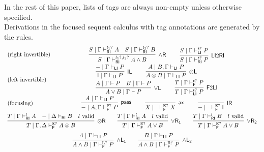 \documentclass[submission,copyright,creativecommons]{eptcs}
\theoremstyle{definition}
\newcommand{\tl}{\otimes \mathsf{L}}
\newcommand{\tr}{\otimes \mathsf{R}}
\newcommand{\pass}{\mathsf{pass}}
\newcommand{\unitl}{\mathsf{IL}}
\newcommand{\unitr}{\mathsf{IR}}
\newcommand{\andlone}{\land \mathsf{L_{1}}}
\newcommand{\andltwo}{\land \mathsf{L_{2}}}
\newcommand{\andr}{\land \mathsf{R}}
\newcommand{\orl}{\lor \mathsf{L}}
\newcommand{\orrone}{\lor \mathsf{R_{1}}}
\newcommand{\orrtwo}{\lor \mathsf{R_{2}}}
\newcommand{\ax}{\mathsf{ax}}
\newcommand{\ot}{\otimes}
\newcommand{\I}{\mathsf{I}}
\newcommand{\RI}{\mathsf{RI}}
\newcommand{\LI}{\mathsf{LI}}
\newcommand{\F}{\mathsf{F}}
\newcommand{\tP}{\mathbb{P}}
\newcommand{\tL}{\mathbb{L}}
\newcommand{\tR}{\mathbb{R}}
\newcommand{\tE}{\mathbb{E}}
\newcommand{\proofbox}[1]{\begin{tabular}{l} #1 \end{tabular}}
\begin{document}
In the rest of this paper, lists of tags are always non-empty unless otherwise specified.
\\
Derivations in the focused sequent calculus with tag annotations are generated by the rules.
\begin{equation}\label{eq:focus}
  \begin{array}{lc}
    \text{(right invertible)} & %
    \proofbox{
      \infer[\andr]{S \mid \Gamma \vdash^{l_1?, l_2?}_{\RI} A \land B}{
        S \mid \Gamma \vdash^{l_1?}_{\RI} A
        &
        S \mid \Gamma \vdash^{l_2?}_{\RI} B
      }
    \qquad
    \infer[\LI 2 \RI]{S \mid \Gamma \vdash^{t?}_{\RI} P}{S \mid \Gamma \vdash^{t?}_{\LI} P}
    }
    \\[10pt]
    \text{(left invertible)} & %
    \proofbox{
      \infer[\unitl]{\I \mid \Gamma \vdash_{\LI} P}{{-} \mid \Gamma \vdash_{\LI} P}
    \qquad
    \infer[\tl]{A \ot B \mid \Gamma \vdash_{\LI} P}{A \mid B , \Gamma \vdash_{\LI} P}
    \\
    \infer[\orl]{A \lor B \mid \Gamma \vdash P}{
      A \mid \Gamma \vdash P
      &
      B \mid \Gamma \vdash P
    }
    \qquad
    \infer[\F 2 \LI]{T \mid \Gamma \vdash^{t?}_{\LI} P}{T \mid \Gamma \vdash^{t?}_{\F} P}
    }
    \\[10pt]
    \text{(focusing)} &    %
    \proofbox{
    \infer[\pass]{{-} \mid A , \Gamma \vdash^{\tP?}_{\F} P }{
        A \mid \Gamma \vdash_{\LI} P
    }
    \qquad
    \infer[\ax]{X \mid \quad \vdash^{\tE?}_{\F} X}{}
    \qquad
    \infer[\unitr]{{-} \mid \quad \vdash^{\tE?}_{\F} \I}{}
    }
    \\[10pt]
    \multicolumn{2}{c}{
    \infer[\tr]{T \mid \Gamma , \Delta \vdash^{\tE?}_{\F} A \ot B}{
      T \mid \Gamma \vdash^{l}_{\RI} A
      &
      {-} \mid \Delta \vdash_{\RI} B
      &
      l \ \text{valid}
    }
    \qquad
    \infer[\orrone]{T \mid \Gamma \vdash^{\tE?}_{\F} A \lor B}{
      T \mid \Gamma \vdash^{l}_{\RI} A
      &
      l \ \text{valid}
    }
    \qquad
    \infer[\orrtwo]{T \mid \Gamma \vdash^{\tE?}_{\F} A \lor B}{
      T \mid \Gamma \vdash^{l}_{\RI} B
      &
      l \ \text{valid}
    }
    }
    \\[6pt]
    \multicolumn{2}{c}{
    \infer[\andlone]{A \land B \mid \Gamma \vdash^{\tL?}_{\F} P}{A \mid \Gamma \vdash_{\LI} P}
    \qquad
    \infer[\andltwo]{A \land B \mid \Gamma \vdash^{\tR?}_{\F} P}{B \mid \Gamma \vdash_{\LI} P}
    }
  \end{array}
\end{equation}
\end{document}
